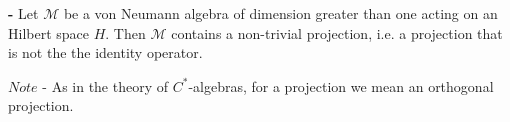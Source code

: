 \documentclass[12pt]{article}
\begin{document}
{\bf {} -} Let $\mathcal{M}$ be a von Neumann algebra of dimension greater than one acting on an Hilbert space $H$. Then $\mathcal{M}$ contains a non-trivial projection, i.e. a projection that is not the   the identity operator.

$Note$ - As in the theory of $C^*$-algebras, for a projection we mean an orthogonal projection.


\end{document}
